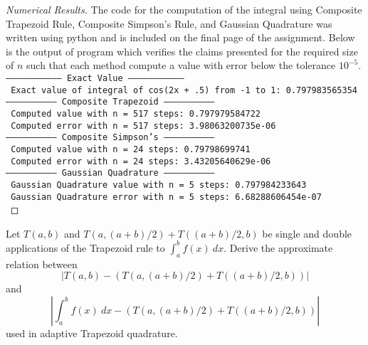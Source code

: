 \documentclass[8pt]{article}
\theoremstyle{definition}
\newenvironment{exercise}[1]
  {\renewcommand\theinnerexercise{#1}\innerexercise}
  {\endinnerexercise}
\begin{document}
\begin{proof}[Numerical Results]
The code for the computation of the integral using Composite Trapezoid Rule, Composite Simpson's Rule, and Gaussian Quadrature was written using python and is included on the final page of the assignment. Below is the output of program which verifies the claims presented for the required size of $n$ such that each method compute a value with error below the tolerance $10^{-5}$.\\

\texttt{--------------------------------- Exact Value ---------------------------------}\\
\indent \texttt{ Exact value of integral of cos(2x + .5) from -1 to 1: 0.797983565354 }\\

\texttt{----------------------------- Composite Trapezoid -----------------------------}\\
\indent \texttt{ Computed value with n = 517 steps: 0.797979584722}\\
\indent \texttt{ Computed error with n = 517 steps: 3.98063200735e-06 }\\

\texttt{----------------------------- Composite Simpson's -----------------------------}\\
\indent \texttt{ Computed value with n = 24 steps: 0.79798699741}\\
\indent \texttt{ Computed error with n = 24 steps: 3.43205640629e-06 }\\

\texttt{----------------------------- Gaussian Quadrature -----------------------------}\\
\indent \texttt{ Gaussian Quadrature value with n = 5 steps: 0.797984233643}\\
\indent \texttt{ Gaussian Quadrature error with n = 5 steps: 6.68288606454e-07 }\\
\end{proof}

\newpage

\begin{exercise}{2}
Let $T(a, b)$ and $T(a, (a + b)/2) + T((a + b)/2, b)$ be single and double applications of the Trapezoid rule to $\int_{a}^{b} f(x) \ dx$. Derive the approximate relation between $$\left| T(a, b) -  \left( T(a, (a + b)/2) + T((a + b)/2, b) \right) \right|$$ and $$\left| \int_{a}^{b} f(x) \ dx - \left( T(a, (a + b)/2) + T((a + b)/2, b) \right) \right|$$ used in adaptive Trapezoid quadrature.
\end{exercise}
\end{document}
